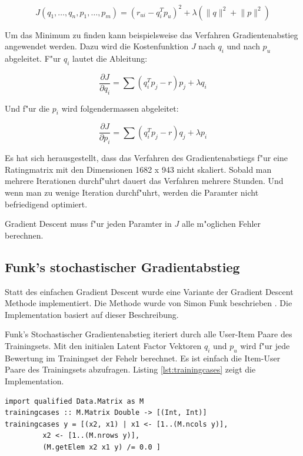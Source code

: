 \documentclass[a4paper, 12pt]{article}
\begin{document}
\begin{equation}
  \label{eq:costfunction}
  J(q_1, \dots , q_n, p_1, \dots, p_m) =  (r_{ui} - q_i^T p_u)^2 + \lambda (\lVert q \rVert^2 + \lVert p \lVert ^2)
\end{equation}
 
Um das Minimum zu finden kann beispielsweise das Verfahren Gradientenabstieg angewendet werden. Dazu wird die Kostenfunktion $J$ nach $q_i$ und nach $p_u$ abgeleitet. F"ur $q_i$ lautet die Ableitung:

\begin{equation}
  \label{eq:decx}
  \frac{ \partial J }{ \partial q_i } = \sum (q_i^T p_j - r) p_j + \lambda q_i
\end{equation}

Und f"ur die $p_i$ wird folgendermassen abgeleitet:

\begin{equation}
  \label{eq:dectheta}
  \frac{ \partial J }{ \partial p_i } = \sum (q_i^T p_j - r) q_j + \lambda p_i
\end{equation}

Es hat sich herausgestellt, dass das Verfahren des Gradientenabstiegs f"ur eine Ratingmatrix mit den Dimensionen 1682 x 943 nicht skaliert. Sobald man mehrere Iterationen durchf"uhrt dauert das Verfahren mehrere Stunden. Und wenn man zu wenige Iteration durchf"uhrt, werden die Paramter nicht befriedigend optimiert.

Gradient Descent muss f"ur jeden Paramter in $J$ alle m"oglichen Fehler berechnen.

\subsection{Funk's stochastischer Gradientabstieg}
\label{sec:funksvd}

Statt des einfachen Gradient Descent wurde eine Variante der Gradient Descent Methode implementiert. Die Methode wurde von Simon Funk beschrieben \cite{funk}. Die Implementation basiert auf dieser Beschreibung.

Funk's Stochastischer Gradientenabstieg iteriert durch alle User-Item Paare des Trainingsets. Mit den initialen Latent Factor Vektoren $q_i$ und $p_u$ wird f"ur jede Bewertung im Trainingset der Fehelr berechnet. Es ist einfach die Item-User Paare des Trainingsets abzufragen. Listing \ref{lst:trainingcases} zeigt die Implementation.

\begin{lstlisting}[caption=Abfrage des Trainingsets,label=lst:trainingcases]
import qualified Data.Matrix as M  
trainingcases :: M.Matrix Double -> [(Int, Int)]
trainingcases y = [(x2, x1) | x1 <- [1..(M.ncols y)], 
         x2 <- [1..(M.nrows y)],
         (M.getElem x2 x1 y) /= 0.0 ]
\end{lstlisting}
\end{document}
